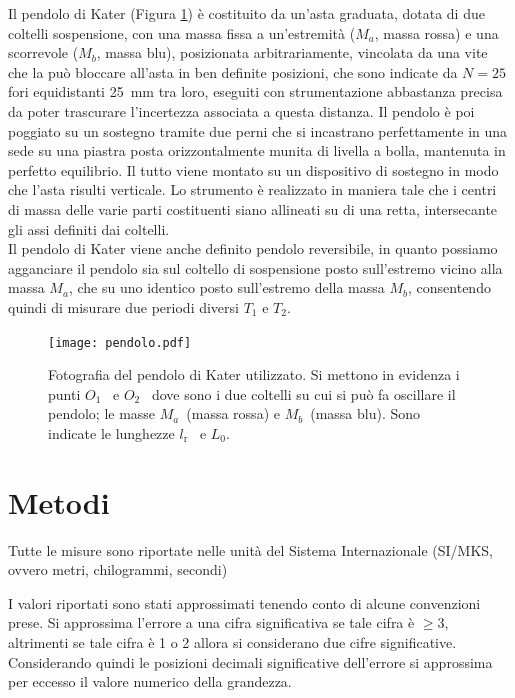 \documentclass[italian, a4paper, 10pt, twocolumn]{../../style/lab_unige}
\newcommand{\reffig}[1]{Figura {\ref{#1}}}%
\newcommand{\Oi}{$O_1$}
\newcommand{\Oii}{$O_2$}
\newcommand{\lr}{$l_{\text{r}}$}
\newcommand{\Ti}[1]{$T_{#1}$}
\newcommand{\Ma}{$M_a$}
\newcommand{\Mb}{$M_b$}
\begin{document}
    Il pendolo di Kater (\reffig{figure:pendolo}) è costituito da un'asta graduata, dotata di due coltelli sospensione, con una massa fissa a un'estremità (\Ma, massa rossa) e una scorrevole (\Mb, massa blu), posizionata arbitrariamente, vincolata da una vite che la può bloccare all'asta in ben definite posizioni, che sono indicate da $N=25$ fori equidistanti 25~mm tra loro, eseguiti con strumentazione abbastanza precisa da poter trascurare l'incertezza associata a questa distanza. Il pendolo è poi poggiato su un sostegno tramite due perni che si incastrano perfettamente in una sede su una piastra posta orizzontalmente munita di livella a bolla, mantenuta in perfetto equilibrio. Il tutto viene montato su un dispositivo di sostegno in modo che l'asta risulti verticale. Lo strumento è realizzato in maniera tale che i centri di massa delle varie parti costituenti siano allineati su di una retta, intersecante gli assi definiti dai coltelli.\\
    Il pendolo di Kater viene anche definito pendolo reversibile, in quanto possiamo agganciare il pendolo sia sul coltello di sospensione posto sull'estremo vicino alla massa \Ma, che su uno identico posto sull'estremo della massa \Mb, consentendo quindi di misurare due periodi diversi \Ti{1} e \Ti{2}. 

    \begin{figure}[h!]
        \texttt{[image: pendolo.pdf]}
        \caption{Fotografia del pendolo di Kater utilizzato. Si mettono in evidenza i punti \Oi~ e \Oii~ dove sono i due coltelli su cui si può fa oscillare il pendolo; le masse \Ma~(massa rossa) e \Mb~(massa blu). Sono indicate le lunghezze \lr~ e $L_0$.}
        \label{figure:pendolo}
    \end{figure}

    \section{Metodi}
    \label{section:methods}
    Tutte le misure sono riportate nelle unità del Sistema Internazionale (SI/MKS, ovvero metri, chilogrammi, secondi)
    
    I valori riportati sono stati approssimati tenendo conto di alcune convenzioni prese. Si approssima l'errore a una cifra significativa se tale cifra è $\geqslant3$, altrimenti se tale cifra è 1 o 2 allora si considerano due cifre significative. Considerando quindi le posizioni decimali significative dell'errore si approssima per eccesso il valore numerico della grandezza.\\
\end{document}
